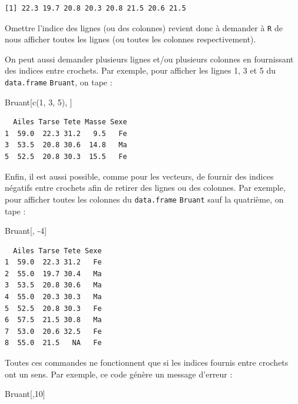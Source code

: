 \documentclass[
  a4paper,
  DIV=11,
  numbers=noendperiod,
  oneside]{scrreprt}
\newenvironment{Shaded}{}{}
\newcommand{\DecValTok}[1]{\textcolor[rgb]{0.00,0.36,0.77}{#1}}
\newcommand{\FunctionTok}[1]{\textcolor[rgb]{0.44,0.26,0.76}{#1}}
\newcommand{\NormalTok}[1]{\textcolor[rgb]{0.14,0.16,0.18}{#1}}
\newcommand{\SpecialCharTok}[1]{\textcolor[rgb]{0.00,0.36,0.77}{#1}}
\begin{document}
\begin{verbatim}
[1] 22.3 19.7 20.8 20.3 20.8 21.5 20.6 21.5
\end{verbatim}

Omettre l'indice des lignes (ou des colonnes) revient donc à demander à
\texttt{R} de nous afficher toutes les lignes (ou toutes les colonnes
respectivement).

On peut aussi demander plusieurs lignes et/ou plusieurs colonnes en
fournissant des indices entre crochets. Par exemple, pour afficher les
lignes 1, 3 et 5 du \texttt{data.frame} \texttt{Bruant}, on tape :

\begin{Shaded}
\begin{Highlighting}[]
\NormalTok{Bruant[}\FunctionTok{c}\NormalTok{(}\DecValTok{1}\NormalTok{, }\DecValTok{3}\NormalTok{, }\DecValTok{5}\NormalTok{), ]}
\end{Highlighting}
\end{Shaded}

\begin{verbatim}
  Ailes Tarse Tete Masse Sexe
1  59.0  22.3 31.2   9.5   Fe
3  53.5  20.8 30.6  14.8   Ma
5  52.5  20.8 30.3  15.5   Fe
\end{verbatim}

Enfin, il est aussi possible, comme pour les vecteurs, de fournir des
indices négatifs entre crochets afin de retirer des lignes ou des
colonnes. Par exemple, pour afficher toutes les colonnes du
\texttt{data.frame} \texttt{Bruant} sauf la quatrième, on tape :

\begin{Shaded}
\begin{Highlighting}[]
\NormalTok{Bruant[, }\SpecialCharTok{{-}}\DecValTok{4}\NormalTok{]}
\end{Highlighting}
\end{Shaded}

\begin{verbatim}
  Ailes Tarse Tete Sexe
1  59.0  22.3 31.2   Fe
2  55.0  19.7 30.4   Ma
3  53.5  20.8 30.6   Ma
4  55.0  20.3 30.3   Ma
5  52.5  20.8 30.3   Fe
6  57.5  21.5 30.8   Ma
7  53.0  20.6 32.5   Fe
8  55.0  21.5   NA   Fe
\end{verbatim}

Toutes ces commandes ne fonctionnent que si les indices fournis entre
crochets ont un sens. Par exemple, ce code génère un message d'erreur :

\begin{Shaded}
\begin{Highlighting}[]
\NormalTok{Bruant[,}\DecValTok{10}\NormalTok{]}
\end{Highlighting}
\end{Shaded}
\end{document}
